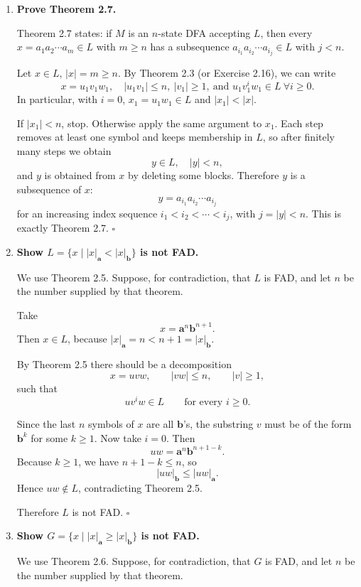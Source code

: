\begin{enumerate}[{2.}1.]
\item \textbf{Prove Theorem 2.7.}

Theorem 2.7 states: if $M$ is an $n$-state DFA accepting $L$, then every
$x=a_1a_2\cdots a_m\in L$ with $m\ge n$ has a subsequence
$a_{i_1}a_{i_2}\cdots a_{i_j}\in L$ with $j<n$.

Let $x\in L$, $|x|=m\ge n$.
By Theorem 2.3 (or Exercise 2.16), we can write
\[
x=u_1v_1w_1,\quad |u_1v_1|\le n,\ |v_1|\ge1,\ \text{and }u_1v_1^iw_1\in L\ \forall i\ge0.
\]
In particular, with $i=0$, $x_1=u_1w_1\in L$ and $|x_1|<|x|$.

If $|x_1|<n$, stop. Otherwise apply the same argument to $x_1$.
Each step removes at least one symbol and keeps membership in $L$, so after finitely many steps we obtain
\[
y\in L,\quad |y|<n,
\]
and $y$ is obtained from $x$ by deleting some blocks.
Therefore $y$ is a subsequence of $x$:
\[
y=a_{i_1}a_{i_2}\cdots a_{i_j}
\]
for an increasing index sequence $i_1<i_2<\cdots<i_j$, with $j=|y|<n$.
This is exactly Theorem 2.7. $\square$

\item \textbf{Show $L=\{x\mid|x|_\mathbf{a}<|x|_\mathbf{b}\}$ is not FAD.}

We use Theorem 2.5. Suppose, for contradiction, that $L$ is FAD, and let $n$
be the number supplied by that theorem.

Take
\[
x=\mathbf{a}^n\mathbf{b}^{n+1}.
\]
Then $x\in L$, because $|x|_\mathbf{a}=n<n+1=|x|_\mathbf{b}$.

By Theorem 2.5 there should be a decomposition
\[
x=uvw,\qquad |vw|\le n,\qquad |v|\ge1,
\]
such that
\[
uv^iw\in L\qquad\text{for every }i\ge0.
\]

Since the last $n$ symbols of $x$ are all $\mathbf{b}$'s, the substring $v$
must be of the form $\mathbf{b}^k$ for some $k\ge1$.
Now take $i=0$. Then
\[
uw=\mathbf{a}^n\mathbf{b}^{n+1-k}.
\]
Because $k\ge1$, we have $n+1-k\le n$, so
\[
|uw|_\mathbf{b}\le |uw|_\mathbf{a}.
\]
Hence $uw\notin L$, contradicting Theorem 2.5.

Therefore $L$ is not FAD. $\square$

\item \textbf{Show $G=\{x\mid|x|_\mathbf{a}\geq|x|_\mathbf{b}\}$ is not FAD.}

We use Theorem 2.6. Suppose, for contradiction, that $G$ is FAD, and let $n$
be the number supplied by that theorem.


\end{enumerate}
